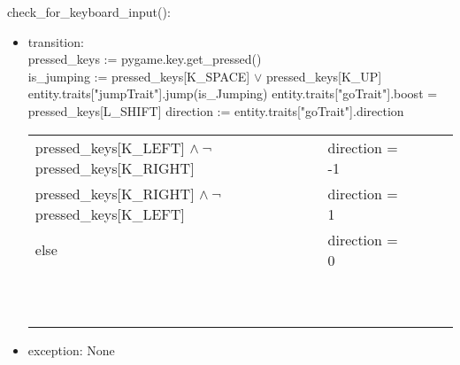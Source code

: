 \documentclass[12pt]{article}
\begin{document}
check\_for\_keyboard\_input():
\begin{itemize}
    \item transition:\\ pressed\_keys := pygame.key.get\_pressed()\\
    is\_jumping := pressed\_keys[K\_SPACE] $\lor$ pressed\_keys[K\_UP]\\
    entity.traits["jumpTrait"].jump(is\_Jumping)
    entity.traits["goTrait"].boost = pressed\_keys[L\_SHIFT]
    direction := entity.traits["goTrait"].direction\\
\begin{table}[H]
\begin{tabular}{lllll}
\cline{1-2}
\multicolumn{1}{|l|}{pressed\_keys{[}K\_LEFT{]} $\land\ \lnot$ pressed\_keys{[}K\_RIGHT{]}} & \multicolumn{1}{l|}{direction = -1} &  &  &  \\ \cline{1-2}
\multicolumn{1}{|l|}{pressed\_keys{[}K\_RIGHT{]} $\land\ \lnot$ pressed\_keys{[}K\_LEFT{]}} & \multicolumn{1}{l|}{direction = 1}  &  &  &  \\ \cline{1-2}
\multicolumn{1}{|l|}{else}                                                                  & \multicolumn{1}{l|}{direction = 0}  &  &  &  \\ \cline{1-2}
                                                                                            &                                     &  &  &  \\
                                                                                            &                                     &  &  &  \\
                                                                                            &                                     &  &  &  \\
                                                                                            &                                     &  &  &  \\
                                                                                            &                                     &  &  &  \\
                                                                                            &                                     &  &  &  \\
                                                                                            &                                     &  &  &  \\
                                                                                            &                                     &  &  &  \\
                                                                                            &                                     &  &  &  \\
                                                                                            &                                     &  &  & 
\end{tabular}
\end{table}
    \item exception: None
\end{itemize}
\end{document}
